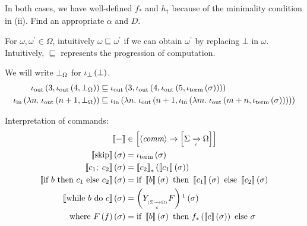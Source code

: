 \begin{enumcirc}
\begin{enumrm}
		\begin{exercise}
			In both cases, we have well-defined $f_*$ and $h_\dagger$ because of the minimality condition in (ii).
			Find an appropriate $\alpha$ and $D$.
		\end{exercise}
		\item
		For $\omega, \omega^\prime \in \Omega$,
		intuitively $\omega \sqsubseteq \omega^\prime$ if we can obtain $\omega^\prime$
		by replacing $\bot$ in $\omega$.
		Intuitively, $\sqsubseteq$ represents the progression of computation.
		\begin{example}
			We will write $\bot_\Omega$ for $\iota_\bot\left( \bot \right)$.
			\begin{align*}
				\iota_{\textrm{out}} \left( 3, \iota_{\textrm{out}}\left( 4, \bot_\Omega \right) \right) \sqsubseteq\;             &
				\iota_{\textrm{out}}\left( 3, \iota_{\textrm{out}}\left( 4, \iota_{\textrm{out}}\left( 5, \iota_{\textrm{term}}\left( \sigma \right) \right) \right) \right) \\
				\iota_{\textrm{in}} \left( \lambda n.\; \iota_{\textrm{out}}\left( n+1,  \bot_\Omega \right) \right) \sqsubseteq\; &
				\iota_{\textrm{in}}\left( \lambda n.\; \iota_{\textrm{out}}\left( n+1, \iota_{\textrm{in}}\left( \lambda m.\; \iota_{\textrm{out}}\left( m+n, \iota_{\textrm{term}}\left( \sigma \right) \right) \right) \right) \right)
			\end{align*}
		\end{example}
	\end{enumrm}
	\item
	Interpretation of commands:
	\begin{align*}
		\bbrackets{-}                                & \in
		\brackets{\chevrons{\textit{comm}} \to \brackets{\Sigma \toc \Omega}}                              \\
		\bbrackets{\cskip} \prths{\sigma}            & =
		\iterm\prths{\sigma}                                                                               \\
		\bbrackets{\cseq{c_1}{c_2}} \prths{\sigma}   & =
		\bbrackets{c_2}_* \prths{\bbrackets{c_1} \prths{\sigma}}                                           \\
		\bbrackets{\cif{b}{c_1}{c_2}} \prths{\sigma} & =
		\cif{\bbrackets{b} \prths{\sigma}}{\bbrackets{c_1} \prths{\sigma}}{\bbrackets{c_2} \prths{\sigma}} \\
		\bbrackets{\cwhile{b}{c}} \prths{\sigma}     & =
		\prths{\subscmath{Y}{(\Sigma \toc \Omega)} F}\footnotemark \prths{\sigma}                          \\
		\textrm{where } F\prths{f}\prths{\sigma}     & =
		\cif{\bbrackets{b} \prths{\sigma}}{f_*\prths{\bbrackets{c} \prths{\sigma}}}{\sigma}                \\

\end{align*}
\end{enumcirc}
